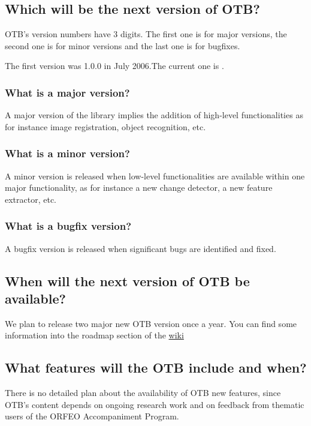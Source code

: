 \subsection{Which will be the next version of OTB?}
OTB's version numbers have 3 digits. The first one is for major
versions, the second one is for minor versions and the last one is for
bugfixes.

The first version was 1.0.0 in July 2006.The current one is \otbversion.

\subsubsection{What is a major version?}
A major version of the library implies the addition of high-level
functionalities as for instance image registration, object recognition, etc.

\subsubsection{What is a minor version?}
A minor version is released when low-level functionalities are
available within one major functionality, as for instance a new
change detector, a new feature extractor, etc.

\subsubsection{What is a bugfix version?}
A bugfix version is released when significant bugs are identified and fixed.

\subsection{When will the next version of OTB be available?}
We plan to release two major new OTB version once a year. You can find some information into the roadmap section of the \href{http://wiki.orfeo-toolbox.org/index.php/Main_Page}{wiki} 

\subsection{What features will the OTB include and when?}
There is no detailed plan about the availability of OTB new features,
since OTB's content depends on ongoing research work and on feedback
from thematic users of the ORFEO Accompaniment Program.

